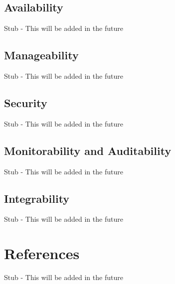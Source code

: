 \documentclass[12pt]{article}
\begin{document}
\subsection{Availability}
Stub - This will be added in the future
\subsection{Manageability}
Stub - This will be added in the future
\subsection{Security}
Stub - This will be added in the future
\subsection{Monitorability and Auditability}
Stub - This will be added in the future
\subsection{Integrability}
Stub - This will be added in the future

\section{References}
Stub - This will be added in the future
\end{document}

